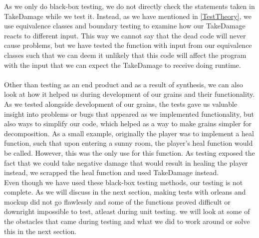 As we only do black-box testing, we do not directly check the statements taken in TakeDamage while we test it. Instead, as we have mentioned in \autoref{TestTheory}, we use equivalence classes and boundary testing to examine how our TakeDamage reacts to different input. This way we cannot say that the dead code will never cause problems, but we have tested the function with input from our equivalence classes such that we can deem it unlikely that this code will affect the program with the input that we can expect the TakeDamage to receive doing runtime. \\ \\
Other than testing as an end product and as a result of synthesis, we can also look at how it helped us during development of our grains and their functionality. As we tested alongside development of our grains, the tests gave us valuable insight into problems or bugs that appeared as we implemented functionality, but also ways to simplify our code, which helped as a way to make grains simpler for decomposition. As a small example, originally the player was to implement a heal function, such that upon entering a sunny room, the player's heal function would be called. However, this was the only use for this function. As testing exposed the fact that we could take negative damage that would result in healing the player instead, we scrapped the heal function and used TakeDamage instead. \\
Even though we have used these black-box testing methods, our testing is not complete. As we will discuss in the next section, making tests with orleans and mockup did not go flawlessly and some of the functions proved difficult or downright impossible to test, atleast during unit testing. we will look at some of the obstacles that came during testing and what we did to work around or solve this in the next section. 